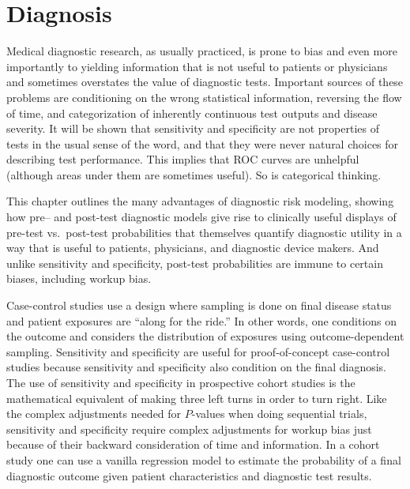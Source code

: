 

\chapter{Diagnosis}

Medical diagnostic research, as usually practiced, is prone to bias
and even more importantly to yielding information that is not useful
to patients or physicians and sometimes overstates the value of
diagnostic tests.  Important sources of these problems are conditioning on
the wrong statistical information, reversing the flow of time, and
categorization of inherently continuous test outputs and disease
severity.  It will be shown that sensitivity and specificity are not
properties of tests in the usual sense of the word, and that
they were never natural choices for describing
test performance.  This implies that ROC curves are unhelpful
(although areas under them are sometimes useful).  So is
categorical thinking.

This chapter outlines the many advantages of diagnostic risk modeling,
showing how pre-- and post-test diagnostic models give
rise to clinically useful displays of pre-test vs.\ post-test
probabilities that themselves quantify diagnostic utility in a way
that is useful to patients, physicians, and diagnostic device makers.
And unlike sensitivity and specificity, post-test probabilities are
immune to certain biases, including workup bias.

Case-control studies use a design where sampling is done on final disease
status and patient exposures are ``along for the ride.''  In other
words, one conditions on the outcome and considers the distribution of
exposures using outcome-dependent sampling.  Sensitivity and
specificity are useful for proof-of-concept case-control studies
because sensitivity and specificity also condition on the final diagnosis.
The use of sensitivity and specificity in prospective cohort studies
is the mathematical equivalent of making three left turns in order to
turn right.   Like the complex adjustments needed for $P$-values when
doing sequential trials, sensitivity and specificity require complex
adjustments for workup bias just because of their backward
consideration of time and information.  In a cohort study one can use
a vanilla regression model to estimate the probability of a final
diagnostic outcome given patient characteristics and diagnostic test results. 



